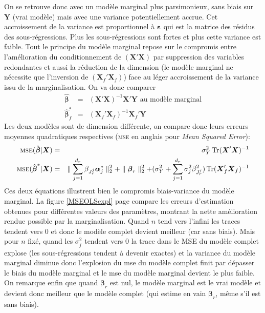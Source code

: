 \documentclass[12pt,a4paper]{report}
\begin{document}
On se retrouve donc avec un modèle marginal plus parsimonieux, sans biais sur $\boldsymbol{Y}$ (vrai modèle) mais avec une variance potentiellement accrue. Cet accroissement de la variance est proportionnel à $\boldsymbol{\varepsilon}$ qui est la matrice des résidus des sous-régressions. Plus les sous-régressions sont fortes et plus cette variance est faible.
Tout le principe du modèle marginal repose sur le compromis entre l'amélioration du conditionnement de $(\boldsymbol{X}'\boldsymbol{X})$ par suppression des variables redondantes et aussi la réduction de la dimension (le modèle marginal ne nécessite que l'inversion de $(\boldsymbol{X}_{f}'\boldsymbol{X}_{f})$) face au léger accroissement de la variance issu de la marginalisation.
On va donc comparer 
	\begin{eqnarray}
		\hat{\boldsymbol{\beta}}&=& (\boldsymbol{X}'\boldsymbol{X})^{-1}\boldsymbol{X}'\boldsymbol{Y} \textrm{ au modèle marginal}  \nonumber \\
		\hat{\boldsymbol{\beta}}^*_f&=& (\boldsymbol{X}_{f}'\boldsymbol{X}_{f})^{-1}\boldsymbol{X}_{f}'\boldsymbol{Y}  \nonumber 
	\end{eqnarray}
	Les deux modèles sont de dimension différente, on compare donc leurs erreurs moyennes quadratiques respectives (\textsc{mse} en anglais pour {\it Mean Squared Error}):
	\begin{eqnarray}
		\textsc{mse}(\hat{\boldsymbol{\beta}}|\boldsymbol{X})&=& \sigma^2_Y \operatorname{Tr}(\boldsymbol{X}'\boldsymbol{X})^{-1}   \nonumber \\
		\textsc{mse}(\hat{\boldsymbol{\beta}}^*|\boldsymbol{X})&=&\parallel \sum_{j=1}^{d_r}\beta_{J_r^j}\boldsymbol{\alpha}_j^* \parallel_2^2+\parallel\boldsymbol{\beta}_r  \parallel_2^2 +(\sigma^2_Y+\sum_{j =1}^{d_r}\sigma^2_{j}\beta_{J_r^j}^2)\operatorname{Tr}(\boldsymbol{X}_f'\boldsymbol{X}_{f})^{-1} \nonumber 
	\end{eqnarray}
		Ces deux équations illustrent bien le compromis biais-variance du modèle marginal.
		La figure \ref{MSEOLSexpl} page \pageref{MSEOLSexpl} compare les erreurs d'estimation obtenues pour différentes valeurs des paramètres, montrant la nette amélioration rendue possible par la marginalisation. Quand $n$ tend vers l'infini les traces tendent vers 0 et donc le modèle complet devient meilleur (car sans biais). Mais pour $n$ fixé, quand les $\sigma_j^2$ tendent vers 0 la trace dans le MSE du modèle complet explose (les sous-régressions tendent à devenir exactes) et la variance du modèle marginal diminue donc l'explosion du {\sc mse} du modèle complet finit par dépasser le biais du modèle marginal et le {\sc mse} du modèle marginal devient le plus faible. On remarque enfin que quand $\boldsymbol{\beta}_r$ est nul, le modèle marginal est le vrai modèle et devient donc meilleur que le modèle complet (qui estime en vain $\boldsymbol{\beta}_r$, même s'il est sans biais).
\end{document}

